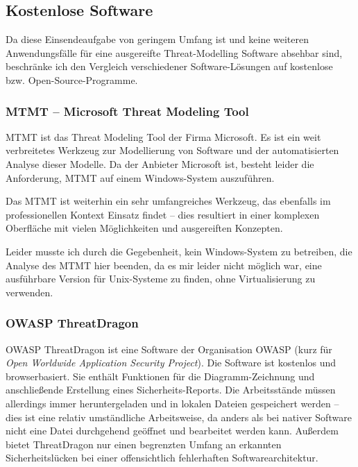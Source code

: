 \documentclass{article}
\begin{document}
\subsection*{Kostenlose Software}

Da diese Einsendeaufgabe von geringem Umfang ist und keine weiteren Anwendungsfälle für 
eine ausgereifte Threat-Modelling Software absehbar sind, beschränke ich den Vergleich 
verschiedener Software-Lösungen auf kostenlose bzw. Open-Source-Programme.

\subsubsection*{MTMT – Microsoft Threat Modeling Tool}

MTMT ist das Threat Modeling Tool der Firma Microsoft. Es ist ein weit verbreitetes 
Werkzeug zur Modellierung von Software und der automatisierten Analyse dieser Modelle. Da 
der Anbieter Microsoft ist, besteht leider die Anforderung, MTMT auf einem Windows-System 
auszuführen.

Das MTMT ist weiterhin ein sehr umfangreiches Werkzeug, das ebenfalls im professionellen 
Kontext Einsatz findet – dies resultiert in einer komplexen Oberfläche mit 
vielen Möglichkeiten und ausgereiften Konzepten.

Leider musste ich durch die Gegebenheit, kein Windows-System zu betreiben, die Analyse 
des MTMT hier beenden, da es mir leider nicht möglich war, eine ausführbare Version für 
Unix-Systeme zu finden, ohne Virtualisierung zu verwenden.

\subsubsection*{OWASP ThreatDragon}

OWASP ThreatDragon ist eine Software der Organisation OWASP (kurz für \textit{Open 
Worldwide Application Security Project}). Die Software ist kostenlos und 
browserbasiert. Sie enthält Funktionen für die Diagramm-Zeichnung und anschließende 
Erstellung eines Sicherheits-Reports. Die Arbeitsstände müssen allerdings immer 
heruntergeladen und in lokalen Dateien gespeichert werden – dies ist eine relativ 
umständliche Arbeitsweise, da anders als bei nativer Software nicht eine Datei durchgehend 
geöffnet und bearbeitet werden kann. Außerdem bietet ThreatDragon nur einen begrenzten 
Umfang an erkannten Sicherheitslücken bei einer offensichtlich fehlerhaften 
Softwarearchitektur.
\end{document}
